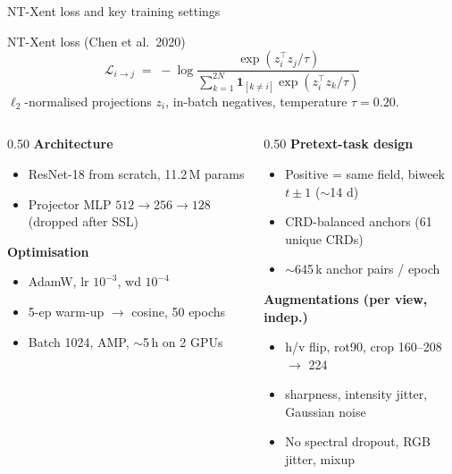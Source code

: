 \documentclass[aspectratio=169,11pt]{beamer}
\begin{document}
\begin{frame}{NT-Xent loss and key training settings}
  \vspace{-4pt}
  \begin{block}{NT-Xent loss (Chen et al.\ 2020)}
    \vspace{-8pt}
    \[
      \mathcal{L}_{i \to j} \;=\; -\log
        \frac{\exp(z_i^\top z_j / \tau)}
             {\sum_{k=1}^{2N} \mathbf{1}_{[k\neq i]} \exp(z_i^\top z_k / \tau)}
    \]
    \vspace{-10pt}
    \centering\scriptsize
    $\ell_2$-normalised projections $z_i$, in-batch negatives,
    temperature $\tau = 0.20$.
  \end{block}

  \vspace{-2pt}
  \begin{columns}[T]
    \begin{column}{0.50\textwidth}
      \footnotesize\textbf{Architecture}
      \begin{itemize}\footnotesize\setlength\itemsep{0pt}
        \item ResNet-18 from scratch, 11.2\,M params
        \item Projector MLP $512 \to 256 \to 128$ (dropped after SSL)
      \end{itemize}
      \footnotesize\textbf{Optimisation}
      \begin{itemize}\footnotesize\setlength\itemsep{0pt}
        \item AdamW, lr $10^{-3}$, wd $10^{-4}$
        \item 5-ep warm-up $\to$ cosine, 50 epochs
        \item Batch 1024, AMP, $\sim$5\,h on 2 GPUs
      \end{itemize}
    \end{column}
    \begin{column}{0.50\textwidth}
      \footnotesize\textbf{Pretext-task design}
      \begin{itemize}\footnotesize\setlength\itemsep{0pt}
        \item Positive = same field, biweek $t \pm 1$ ($\sim$14 d)
        \item CRD-balanced anchors (61 unique CRDs)
        \item $\sim$645\,k anchor pairs / epoch
      \end{itemize}
      \footnotesize\textbf{Augmentations (per view, indep.)}
      \begin{itemize}\footnotesize\setlength\itemsep{0pt}
        \item h/v flip, rot90, crop 160--208 $\to$ 224
        \item sharpness, intensity jitter, Gaussian noise
        \item \alert{No} spectral dropout, RGB jitter, mixup
      \end{itemize}
    \end{column}
  \end{columns}
\end{frame}
\end{document}

